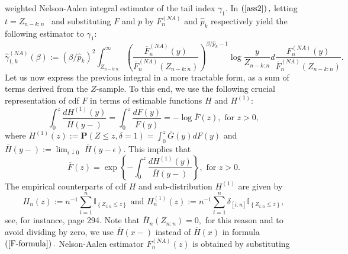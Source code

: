 \documentclass[reqno,openbib,runningheads,a4paper,12pt]{amsart}%
\begin{document}
weighted Nelson-Aalen integral estimator of the tail index $\gamma_{1}.$ In
$\left(  \ref{ass2}\right)  ,$ letting $t=Z_{n-k:n}$ \ and substituting $F$
and $p$ by $F_{n}^{\left(  NA\right)  }$ and $\widehat{p}_{k}$ respectively
yield the following estimator to $\gamma_{1}:$%
\begin{equation}
\widehat{\gamma}_{1,k}^{\left(  NA\right)  }\left(  \beta\right)  :=\left(
\beta/\widehat{p}_{k}\right)  ^{2}\int_{Z_{n-k:n}}^{\infty}\left(
\frac{\overline{F}_{n}^{\left(  NA\right)  }\left(  y\right)  }{\overline
{F}_{n}^{\left(  NA\right)  }\left(  Z_{n-k:n}\right)  }\right)
^{\beta/\widehat{p}_{k}-1}\log\frac{y}{Z_{n-k:n}}d\frac{F_{n}^{\left(
NA\right)  }\left(  y\right)  }{\overline{F}_{n}^{\left(  NA\right)  }\left(
Z_{n-k:n}\right)  }. \label{f-form}%
\end{equation}
Let us now express the previous integral in a more tractable form, as a sum of
terms derived from the $Z$-sample. To this end, we use the following crucial
representation of cdf $F$ in terms of estimable functions $H$ and $H^{\left(
1\right)  }:$%
\[
\int_{0}^{z}\frac{dH^{\left(  1\right)  }\left(  y\right)  }{\overline
{H}\left(  y-\right)  }=\int_{0}^{z}\frac{dF\left(  y\right)  }{\overline
{F}\left(  y\right)  }=-\log\overline{F}\left(  z\right)  ,\text{ for }z>0,
\]
where $H^{\left(  1\right)  }\left(  z\right)  :=\mathbf{P}\left(  Z\leq
z,\delta=1\right)  =\int_{0}^{z}\overline{G}\left(  y\right)  dF\left(
y\right)  $ and $\overline{H}\left(  y-\right)  :=\lim_{\epsilon\downarrow0}$
$\overline{H}\left(  y-\epsilon\right)  .$ This implies that%
\begin{equation}
\overline{F}\left(  z\right)  =\exp\left\{  -\int_{0}^{z}\frac{dH^{\left(
1\right)  }\left(  y\right)  }{\overline{H}\left(  y-\right)  }\right\}
,\text{ for }z>0. \label{F-formula}%
\end{equation}
The empirical counterparts of cdf $H$ and sub-distribution $H^{\left(
1\right)  }$ are given by
\[
H_{n}\left(  z\right)  :=n^{-1}\sum_{i=1}^{n}\mathbb{I}_{\left\{  Z_{i:n}\leq
z\right\}  }\text{ and }H_{n}^{\left(  1\right)  }\left(  z\right)
:=n^{-1}\sum_{i=1}^{n}\delta_{\left[  i:n\right]  }\mathbb{I}_{\left\{
Z_{i:n}\leq z\right\}  },
\]
see, for instance, \cite{SW86} page 294. Note that $\overline{H}_{n}\left(
Z_{n:n}\right)  =0,$ for this reason and to avoid dividing by zero, we use
$\overline{H}\left(  x-\right)  $ instead of $\overline{H}\left(  x\right)  $
in formula $\left(  \ref{F-formula}\right)  .$ Nelson-Aalen estimator
$F_{n}^{\left(  NA\right)  }\left(  z\right)  $ is obtained by substituting
\end{document}
